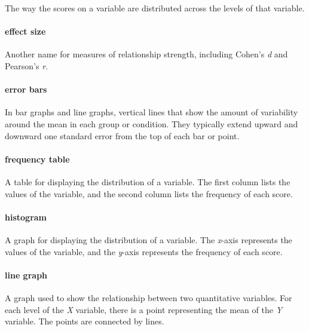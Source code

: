 \documentclass[
]{krantz}
\begin{document}
The way the scores on a variable are distributed across the levels of that variable.

\paragraph*{effect size}\label{effect-size}

Another name for measures of relationship strength, including Cohen's \emph{d} and Pearson's \emph{r}.

\paragraph*{error bars}\label{error-bars}

In bar graphs and line graphs, vertical lines that show the amount of variability around the mean in each group or condition. They typically extend upward and downward one standard error from the top of each bar or point.

\paragraph*{frequency table}\label{frequency-table}

A table for displaying the distribution of a variable. The first column lists the values of the variable, and the second column lists the frequency of each score.

\paragraph*{histogram}\label{histogram}

A graph for displaying the distribution of a variable. The \emph{x}-axis represents the values of the variable, and the \emph{y}-axis represents the frequency of each score.

\paragraph*{line graph}\label{line-graph}

A graph used to show the relationship between two quantitative variables. For each level of the \emph{X} variable, there is a point representing the mean of the \emph{Y} variable. The points are connected by lines.
\end{document}
